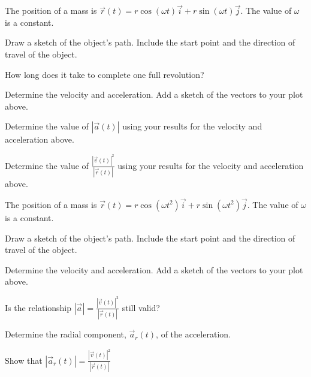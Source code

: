 \begin{problem}
%

\item The position of a mass is
  $\vec{r}(t)=r\cos(\omega t)\vec{i}+r\sin(\omega t)\vec{j}$. The
  value of $\omega$ is a constant.
  \begin{subproblem}
  \item Draw a sketch of the object's path. Include the start point
    and the direction of travel of the object.
    \vfill
  \item How long does it take to complete one full revolution?
    \vspace{3em}
  \item Determine the velocity and acceleration. Add a sketch of the
    vectors to your plot above.
    \vfill
    \clearpage
  \item Determine the value of $|\vec{a}(t)|$ using your results for
    the velocity and acceleration above.  
    \vfill
  \item Determine the value of $\frac{|\vec{v}(t)|^2}{|\vec{r}(t)|}$
    using your results for the velocity and acceleration above.
    \vfill
  \end{subproblem}

\end{problem}

\begin{problem}
\item The position of a mass is
  $\vec{r}(t)=r\cos(\omega t^2)\vec{i}+r\sin(\omega t^2)\vec{j}$. The
  value of $\omega$ is a constant.
  \begin{subproblem}
  \item Draw a sketch of the object's path. Include the start point
    and the direction of travel of the object.
    \vfill
  \item Determine the velocity and acceleration. Add a sketch of the
    vectors to your plot above.
    \vfill
    \clearpage
  \item Is the relationship $|\vec{a}|=\frac{|\vec{v}(t)|^2}{|\vec{r}(t)|}$
    still valid?
    \vfill
  \item Determine the radial component, $\vec{a}_r(t)$, of the
    acceleration.
    \vfill
  \item Show that $|\vec{a}_r(t)| = \frac{|\vec{v}(t)|^2}{|\vec{r}(t)|}$
    \vfill
  \end{subproblem}
\end{problem}

